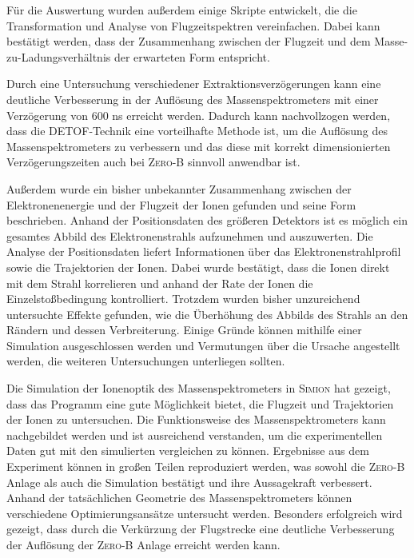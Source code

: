 Für die Auswertung wurden außerdem einige Skripte entwickelt, die die Transformation und Analyse von Flugzeitspektren vereinfachen. Dabei kann bestätigt werden, dass der Zusammenhang zwischen der Flugzeit und dem Masse-zu-Ladungsverhältnis der erwarteten Form entspricht.

Durch eine Untersuchung verschiedener Extraktionsverzögerungen kann eine deutliche Verbesserung in der Auflösung des Massenspektrometers mit einer Verzögerung von 600 ns erreicht werden. Dadurch kann nachvollzogen werden, dass die DETOF-Technik eine vorteilhafte Methode ist, um die Auflösung des Massenspektrometers zu verbessern und das diese mit korrekt dimensionierten Verzögerungszeiten auch bei \textsc{Zero-B} sinnvoll anwendbar ist.

Außerdem wurde ein bisher unbekannter Zusammenhang zwischen der Elektronenenergie und der Flugzeit der Ionen gefunden und seine Form beschrieben. Anhand der Positionsdaten des größeren Detektors ist es möglich ein gesamtes Abbild des Elektronenstrahls aufzunehmen und auszuwerten. Die Analyse der Positionsdaten liefert Informationen über das Elektronenstrahlprofil sowie die Trajektorien der Ionen. Dabei wurde bestätigt, dass die Ionen direkt mit dem Strahl korrelieren und anhand der Rate der Ionen die Einzelstoßbedingung kontrolliert. Trotzdem wurden bisher unzureichend untersuchte Effekte gefunden, wie die Überhöhung des Abbilds des Strahls an den Rändern und dessen Verbreiterung. Einige Gründe können mithilfe einer Simulation ausgeschlossen werden und Vermutungen über die Ursache angestellt werden, die weiteren Untersuchungen unterliegen sollten.

Die Simulation der Ionenoptik des Massenspektrometers in \textsc{Simion} hat gezeigt, dass das Programm eine gute Möglichkeit bietet, die Flugzeit und Trajektorien der Ionen zu untersuchen. Die Funktionsweise des Massenspektrometers kann nachgebildet werden und ist ausreichend verstanden, um die experimentellen Daten gut mit den simulierten vergleichen zu können. Ergebnisse aus dem Experiment können in großen Teilen reproduziert werden, was sowohl die \textsc{Zero-B} Anlage als auch die Simulation bestätigt und ihre Aussagekraft verbessert. Anhand der tatsächlichen Geometrie des Massenspektrometers können verschiedene Optimierungsansätze untersucht werden. Besonders erfolgreich wird gezeigt, dass durch die Verkürzung der Flugstrecke eine deutliche Verbesserung der Auflösung der \textsc{Zero-B} Anlage erreicht werden kann. 

